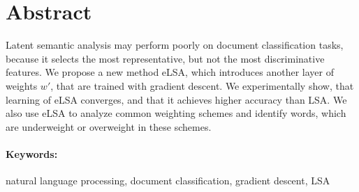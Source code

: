 \documentclass[12pt, oneside]{book}
\theoremstyle{definition}
\begin{document}
\section*{Abstract}

Latent semantic analysis may perform poorly on document classification tasks, because it selects the most representative, but not the most discriminative features.
We propose a new method eLSA, which introduces another layer of weights $w'$, that are trained with gradient descent.
We experimentally show, that learning of eLSA converges, and that it achieves higher accuracy than LSA. 
We also use eLSA to analyze common weighting schemes and identify words, which are underweight or overweight in these schemes.

\paragraph*{Keywords:} natural language processing, document classification, gradient descent, LSA




%
%



\newpage 

\tableofcontents




\listoffigures


\listoftables


\mainmatter

 


\newpage	

{
    \backmatter
    
    \thispagestyle{empty}
    \nocite{*}
    \clearpage
    
    
     
}

\appendix


\end{document}
